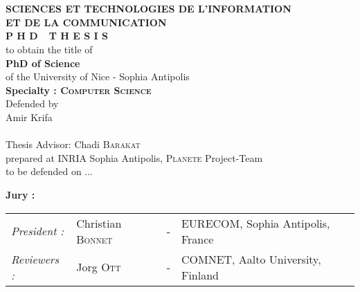 \begin{titlepage}
\begin{center}
 \\
\vspace*{0.3cm}
 \\
\noindent \textbf{SCIENCES ET TECHNOLOGIES DE L'INFORMATION \\ ET DE LA COMMUNICATION} \\
\vspace*{0.5cm}
\noindent \Huge \textbf{P H D\ \ T H E S I S} \\
\vspace*{0.3cm}
\noindent \large {to obtain the title of} \\
\vspace*{0.3cm}
\noindent \LARGE \textbf{PhD of Science} \\
\vspace*{0.3cm}
\noindent \Large of the University of Nice - Sophia Antipolis \\
\noindent \Large \textbf{Specialty : \textsc{Computer Science}}\\
\vspace*{0.4cm}
\noindent \large {Defended by\\}
\noindent \LARGE Amir Krifa \\
\vspace*{0.8cm}
 \\
\vspace*{0.8cm}
\noindent \Large Thesis Advisor: Chadi \textsc{Barakat} \\
\vspace*{0.2cm}
\noindent \Large prepared at INRIA Sophia Antipolis, \textsc{Planete} Project-Team\\
\vspace*{0.2cm}
\noindent \large to be defended on ... \\
\vspace*{0.5cm}
\end{center}
\noindent \large \textbf{Jury :} \\
\begin{center}
\noindent \large 
\begin{tabular}{llcl}
\textit{President :}	& Christian \textsc{Bonnet}		& - & EURECOM, Sophia Antipolis, France\\
      \textit{Reviewers :}	& Jorg \textsc{Ott}	& - & COMNET, Aalto University, Finland\\

\end{tabular}
\end{center}
\end{titlepage}
